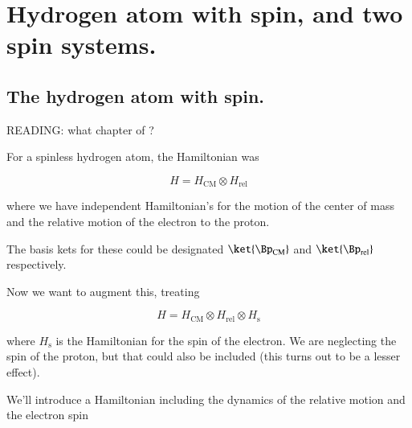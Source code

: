 %
%

\chapter{Hydrogen atom with spin, and two spin systems.}
\label{chap:qmTwoL16}
{}
\date{Nov 2, 2011}

\beginArtWithToc


%
%
\section{The hydrogen atom with spin.}

READING: what chapter of \cite{desai2009quantum} ?

For a spinless hydrogen atom, the Hamiltonian was

\begin{equation}\label{eqn:qmTwoL16:10}
H = H_{\text{CM}} \otimes H_{\text{rel}}
\end{equation}

where we have independent Hamiltonian's for the motion of the center of mass and the relative motion of the electron to the proton.

The basis kets for these could be designated $\ket{\Bp_\text{CM}}$ and $\ket{\Bp_\text{rel}}$ respectively.

Now we want to augment this, treating

\begin{equation}\label{eqn:qmTwoL16:30}
H = H_{\text{CM}} \otimes H_{\text{rel}} \otimes H_{\text{s}}
\end{equation}

where $H_{\text{s}}$ is the Hamiltonian for the spin of the electron.  We are neglecting the spin of the proton, but that could also be included (this turns out to be a lesser effect).

We'll introduce a Hamiltonian including the dynamics of the relative motion and the electron spin

